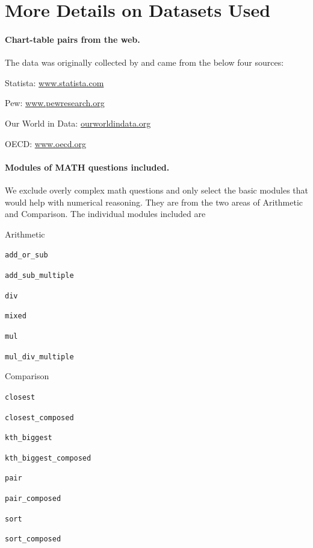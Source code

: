 \appendix



\section{More Details on Datasets Used}\label{sec:dataset_details}

\paragraph{Chart-table pairs from the web.} The data was originally collected by \citet{masry-etal-2022-chartqa} and came from the below four sources:
\begin{compactitem}
    \item Statista: \url{www.statista.com}
    \item Pew: \url{www.pewresearch.org}
    \item Our World in Data: \url{ourworldindata.org}
    \item OECD: \url{www.oecd.org}
\end{compactitem}

\paragraph{Modules of MATH questions included.} We exclude overly complex math questions and only select the basic modules that would help with numerical reasoning. They are from the two areas of Arithmetic and Comparison. The individual modules included are
\begin{compactitem}
    \item Arithmetic
    \begin{compactitem}
        \item \texttt{add\_or\_sub}
        \item \texttt{add\_sub\_multiple}
        \item \texttt{div}
        \item \texttt{mixed}
        \item \texttt{mul}
        \item \texttt{mul\_div\_multiple}
    \end{compactitem}
     
    \item Comparison
    \begin{compactitem}
        \item \texttt{closest}
        \item \texttt{closest\_composed}
        \item \texttt{kth\_biggest}
        \item \texttt{kth\_biggest\_composed}
        \item \texttt{pair}
        \item \texttt{pair\_composed}
        \item \texttt{sort}
        \item \texttt{sort\_composed}
    \end{compactitem}
\end{compactitem}

